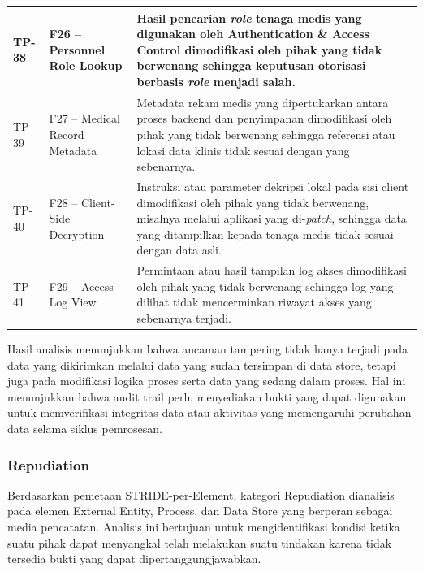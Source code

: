 \begin{xltabular}{\textwidth}{|>{\centering\arraybackslash}p{1.8cm}|>{\raggedright\arraybackslash}p{3.2cm}|X|}
    TP-38 &
    F26 -- Personnel Role Lookup &
    Hasil pencarian \textit{role} tenaga medis yang digunakan oleh Authentication \& Access Control dimodifikasi oleh pihak yang tidak berwenang sehingga keputusan otorisasi berbasis \textit{role} menjadi salah. \\
    \hline

    TP-39 &
    F27 -- Medical Record Metadata &
    Metadata rekam medis yang dipertukarkan antara proses backend dan penyimpanan dimodifikasi oleh pihak yang tidak berwenang sehingga referensi atau lokasi data klinis tidak sesuai dengan yang sebenarnya. \\
    \hline

    TP-40 &
    F28 -- Client-Side Decryption &
    Instruksi atau parameter dekripsi lokal pada sisi client dimodifikasi oleh pihak yang tidak berwenang, misalnya melalui aplikasi yang di-\textit{patch}, sehingga data yang ditampilkan kepada tenaga medis tidak sesuai dengan data asli. \\
    \hline

    TP-41 &
    F29 -- Access Log View &
    Permintaan atau hasil tampilan log akses dimodifikasi oleh pihak yang tidak berwenang sehingga log yang dilihat tidak mencerminkan riwayat akses yang sebenarnya terjadi. \\
    \hline

\end{xltabular}

Hasil analisis menunjukkan bahwa ancaman tampering tidak hanya terjadi pada data yang dikirimkan melalui data yang sudah tersimpan di data store, tetapi juga pada modifikasi logika proses serta data yang sedang dalam proses. Hal ini menunjukkan bahwa audit trail perlu menyediakan bukti yang dapat digunakan untuk memverifikasi integritas data atau aktivitas yang memengaruhi perubahan data selama siklus pemrosesan.

\subsubsection{Repudiation}

Berdasarkan pemetaan STRIDE-per-Element, kategori Repudiation dianalisis pada elemen External Entity, Process, dan Data Store yang berperan sebagai media pencatatan. Analisis ini bertujuan untuk mengidentifikasi kondisi ketika suatu pihak dapat menyangkal telah melakukan suatu tindakan karena tidak tersedia bukti yang dapat dipertanggungjawabkan.

